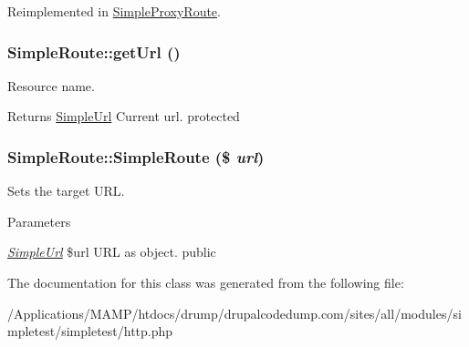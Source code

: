 Reimplemented in \hyperlink{class_simple_proxy_route_a1741241e4a4d7ed555adf373008c7cf0}{SimpleProxyRoute}.\hypertarget{class_simple_route_ac4c2ad3f89c50dd48d9bc66e828dac4c}{
\subsubsection[{getUrl}]{\setlength{\rightskip}{0pt plus 5cm}SimpleRoute::getUrl ()}}
\label{class_simple_route_ac4c2ad3f89c50dd48d9bc66e828dac4c}
Resource name. \begin{DoxyReturn}{Returns}
\hyperlink{class_simple_url}{SimpleUrl} Current url.  protected 
\end{DoxyReturn}
\hypertarget{class_simple_route_aad5ce6e580494698a068f67ebf9c3c6e}{
\subsubsection[{SimpleRoute}]{\setlength{\rightskip}{0pt plus 5cm}SimpleRoute::SimpleRoute (\$ {\em url})}}
\label{class_simple_route_aad5ce6e580494698a068f67ebf9c3c6e}
Sets the target URL. 
\begin{DoxyParams}{Parameters}
\item[{\em \hyperlink{class_simple_url}{SimpleUrl}}]\$url URL as object.  public \end{DoxyParams}


The documentation for this class was generated from the following file:\begin{DoxyCompactItemize}
\item 
/Applications/MAMP/htdocs/drump/drupalcodedump.com/sites/all/modules/simpletest/simpletest/http.php\end{DoxyCompactItemize}
